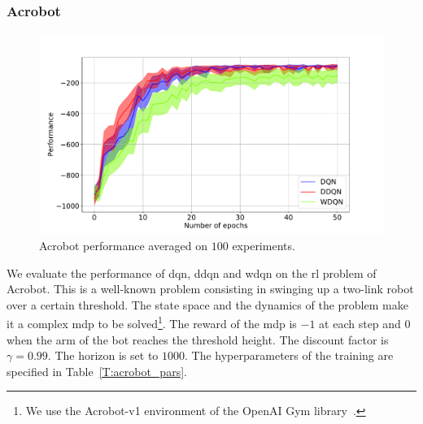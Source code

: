 \subsubsection{Acrobot}
\begin{figure}[t]
  \centering
  \includegraphics[scale=.35]{./img/acrobot.pdf}
  \caption[Acrobot results]{Acrobot performance averaged on $100$ experiments.
  }
  \label{F:acrobot_wdqn}
\end{figure}
We evaluate the performance of \gls{dqn}, \gls{ddqn} and \gls{wdqn} on the \gls{rl} problem of Acrobot. This is a well-known problem consisting in swinging up a two-link robot over a certain threshold. The state space and the dynamics of the problem make it a complex \gls{mdp} to be solved\footnote{We use the Acrobot-v1 environment of the OpenAI Gym library~\cite{gym}.}. The reward of the \gls{mdp} is $-1$ at each step and $0$ when the arm of the bot reaches the threshold height. The discount factor is $\gamma = 0.99$. The horizon is set to $1000$. The hyperparameters of the training are specified in Table~\ref{T:acrobot_pars}.

